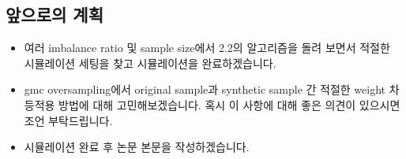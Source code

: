 \documentclass[a4papaer, 11pt]{article}
\begin{document}
\subsection{앞으로의 계획}
\begin{itemize}
	\item 여러 imbalance ratio 및 sample size에서 2.2의 알고리즘을 돌려 보면서 적절한 시뮬레이션 세팅을 찾고 시뮬레이션을 완료하겠습니다.
	\item gmc oversampling에서 original sample과 synthetic sample 간 적절한 weight 차등적용 방법에 대해 고민해보겠습니다. 혹시 이 사항에 대해 좋은 의견이 있으시면 조언 부탁드립니다.
	\item 시뮬레이션 완료 후 논문 본문을 작성하겠습니다.
\end{itemize}
\end{document}
